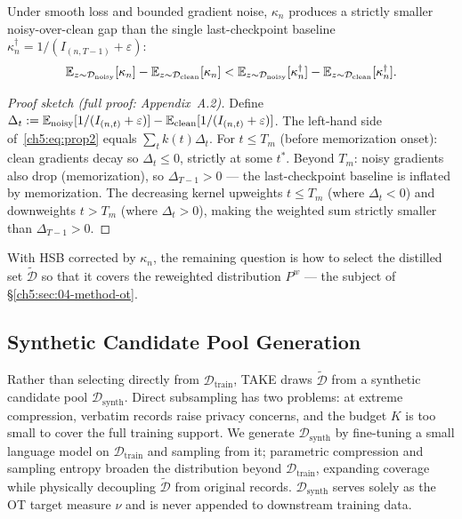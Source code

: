 \begin{foldable}
	\begin{proposition}
		Under smooth loss and bounded gradient noise, $\kappa_n$ produces a strictly smaller noisy-over-clean gap than the single last-checkpoint baseline $\kappa^\dagger_n = 1/(I_{(n,T-1)}+\varepsilon)$:
		\begin{equation}
			\mathbb{E}_{z \sim \mathcal{D}_\textup{noisy}}[\kappa_n] - \mathbb{E}_{z \sim \mathcal{D}_\textup{clean}}[\kappa_n]
			< \mathbb{E}_{z \sim \mathcal{D}_\textup{noisy}}[\kappa^\dagger_n] - \mathbb{E}_{z \sim \mathcal{D}_\textup{clean}}[\kappa^\dagger_n].
			\label{ch5:eq:prop2}
		\end{equation}
	\end{proposition}
	\begin{proof}[Proof sketch (full proof: Appendix~A.2)]
		Define $\Delta_t := \mathbb{E}_\textup{noisy}[1/(I_{(n,t)}+\varepsilon)] - \mathbb{E}_\textup{clean}[1/(I_{(n,t)}+\varepsilon)]$.
		The left-hand side of~\eqref{ch5:eq:prop2} equals $\sum_t k(t)\Delta_t$.
		For $t \leq T_m$ (before memorization onset): clean gradients decay so $\Delta_t \leq 0$, strictly at some $t^*$.
		Beyond $T_m$: noisy gradients also drop (memorization), so $\Delta_{T-1} > 0$ — the last-checkpoint baseline is inflated by memorization.
		The decreasing kernel upweights $t \leq T_m$ (where $\Delta_t < 0$) and downweights $t > T_m$ (where $\Delta_t > 0$), making the weighted sum strictly smaller than $\Delta_{T-1} > 0$.
	\end{proof}
	With HSB corrected by $\kappa_n$, the remaining question is how to select the distilled set $\tilde{\mathcal{D}}$ so that it covers the reweighted distribution $P^w$ — the subject of \S\ref{ch5:sec:04-method-ot}.
\end{foldable}

\subsection{Synthetic Candidate Pool Generation} \label{ch5:sec:04-pool}

\begin{foldable} %
	Rather than selecting directly from $\mathcal{D}_\text{train}$, TAKE draws $\tilde{\mathcal{D}}$ from a synthetic candidate pool $\mathcal{D}_\text{synth}$.
	Direct subsampling has two problems: at extreme compression, verbatim records raise privacy concerns, and the budget $K$ is too small to cover the full training support.
	We generate $\mathcal{D}_\text{synth}$ by fine-tuning a small language model on $\mathcal{D}_\text{train}$ and sampling from it; parametric compression and sampling entropy broaden the distribution beyond $\mathcal{D}_\text{train}$, expanding coverage while physically decoupling $\tilde{\mathcal{D}}$ from original records.
	$\mathcal{D}_\text{synth}$ serves solely as the OT target measure $\nu$ and is never appended to downstream training data.
\end{foldable}

